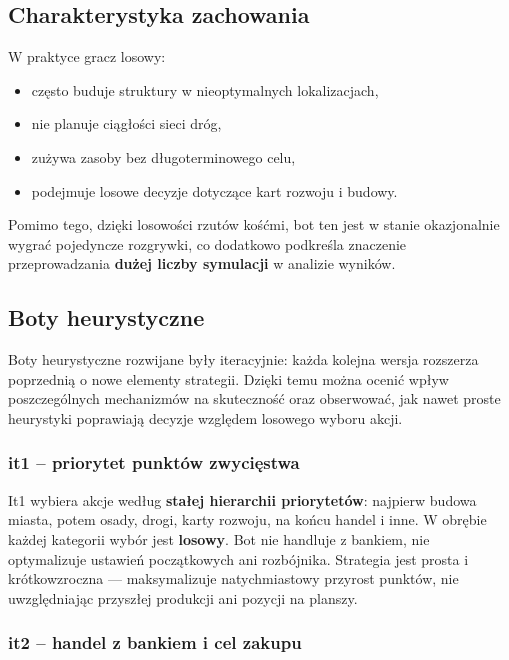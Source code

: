 \documentclass[polish,inz,longabstract]{iithesis}
\begin{document}
\subsection{Charakterystyka zachowania}

W praktyce gracz losowy:

\begin{itemize}
\item często buduje struktury w nieoptymalnych lokalizacjach,
\item nie planuje ciągłości sieci dróg,
\item zużywa zasoby bez długoterminowego celu,
\item podejmuje losowe decyzje dotyczące kart rozwoju i budowy.
\end{itemize}

Pomimo tego, dzięki losowości rzutów kośćmi, bot ten jest w stanie okazjonalnie wygrać pojedyncze rozgrywki, co dodatkowo podkreśla znaczenie przeprowadzania \textbf{dużej liczby symulacji} w analizie wyników.


\subsection{Boty heurystyczne}
\label{sec:heuristic}

Boty heurystyczne rozwijane były iteracyjnie: każda kolejna wersja rozszerza poprzednią o nowe elementy strategii. Dzięki temu można ocenić wpływ poszczególnych mechanizmów na skuteczność oraz obserwować, jak nawet proste heurystyki poprawiają decyzje względem losowego wyboru akcji.

\subsubsection{it1 -- priorytet punktów zwycięstwa}

It1 wybiera akcje według \textbf{stałej hierarchii priorytetów}: najpierw budowa miasta, potem osady, drogi, karty rozwoju, na końcu handel i inne. W obrębie każdej kategorii wybór jest \textbf{losowy}. Bot nie handluje z bankiem, nie optymalizuje ustawień początkowych ani rozbójnika. Strategia jest prosta i krótkowzroczna --- maksymalizuje natychmiastowy przyrost punktów, nie uwzględniając przyszłej produkcji ani pozycji na planszy.

\subsubsection{it2 -- handel z bankiem i cel zakupu}
\end{document}

